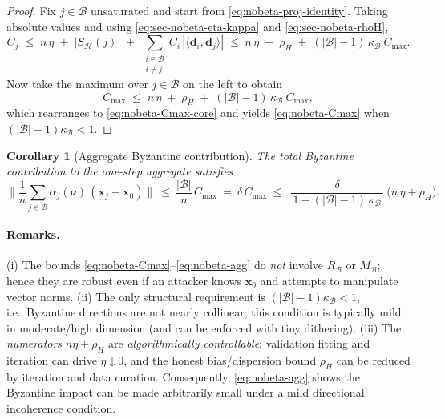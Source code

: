 \documentclass{article}
\theoremstyle{plain}
\newtheorem{corollary}[theorem]{Corollary}
\theoremstyle{definition}
\theoremstyle{remark}
\begin{document}
\begin{proof}
Fix $j\in\mathcal{B}$ unsaturated and start from \eqref{eq:nobeta-proj-identity}.
Taking absolute values and using \eqref{eq:sec-nobeta-eta-kappa} and \eqref{eq:sec-nobeta-rhoH},
\[
C_j
\;\le\;
n\,\eta \;+\; |S_{\mathcal{H}}(j)|
\;+\;\sum_{\substack{i\in\mathcal{B}\\ i\neq j}} C_i\,|\langle \bm{d}_i,\bm{d}_j\rangle|
\;\le\;
n\,\eta \;+\; \rho_H \;+\; (|\mathcal{B}|-1)\,\kappa_{\mathcal{B}}\ C_{\max}.
\]
Now take the maximum over $j\in\mathcal{B}$ on the left to obtain
\[
C_{\max}
\;\le\;
n\,\eta \;+\; \rho_H \;+\; (|\mathcal{B}|-1)\,\kappa_{\mathcal{B}}\ C_{\max},
\]
which rearranges to \eqref{eq:nobeta-Cmax-core} and yields \eqref{eq:nobeta-Cmax}
when $(|\mathcal{B}|-1)\kappa_{\mathcal{B}}<1$.
\end{proof}

\begin{corollary}[Aggregate Byzantine contribution]
\label{cor:nobeta-agg}
The total Byzantine contribution to the one-step aggregate satisfies
\begin{equation}
\Biggl\|
\frac{1}{n}\sum_{j\in\mathcal{B}} \alpha_j(\bm{\nu})\,(\bm{x}_j-\bm{x}_0)
\Biggr\|
\ \le\
\frac{|\mathcal{B}|}{n}\,C_{\max}
\ =\
\delta\,C_{\max}
\ \le\
\boxed{\;
\frac{\delta}{\,1-(|\mathcal{B}|-1)\,\kappa_{\mathcal{B}}\,}\ \bigl(n\,\eta+\rho_H\bigr).
\;}
\label{eq:nobeta-agg}
\end{equation}
\end{corollary}

\paragraph{Remarks.}
(i) The bounds \eqref{eq:nobeta-Cmax}–\eqref{eq:nobeta-agg} do \emph{not} involve
$R_{\mathcal{B}}$ or $M_{\mathcal{B}}$; hence they are robust even if an attacker
knows $\bm{x}_0$ and attempts to manipulate vector norms.
(ii) The only structural requirement is $(|\mathcal{B}|-1)\kappa_{\mathcal{B}}<1$,
i.e.\ Byzantine directions are not nearly collinear; this condition is typically
mild in moderate/high dimension (and can be enforced with tiny dithering).
(iii) The \emph{numerators} $n\eta+\rho_H$ are \emph{algorithmically controllable}:
validation fitting and iteration can drive $\eta\!\downarrow\!0$, and the honest
bias/dispersion bound $\rho_H$ can be reduced by iteration and data curation.
Consequently, \eqref{eq:nobeta-agg} shows the Byzantine impact can be made
arbitrarily small under a mild directional incoherence condition.
\end{document}
